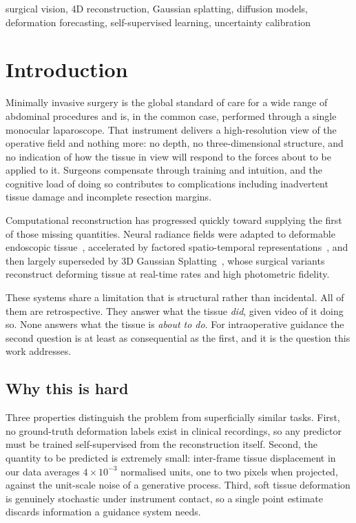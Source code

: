 \documentclass[conference]{IEEEtran}
\begin{document}
\begin{IEEEkeywords}
surgical vision, 4D reconstruction, Gaussian splatting, diffusion models,
deformation forecasting, self-supervised learning, uncertainty calibration
\end{IEEEkeywords}

\section{Introduction}

Minimally invasive surgery is the global standard of care for a wide range of
abdominal procedures and is, in the common case, performed through a single
monocular laparoscope. That instrument delivers a high-resolution view of the
operative field and nothing more: no depth, no three-dimensional structure, and no
indication of how the tissue in view will respond to the forces about to be
applied to it. Surgeons compensate through training and intuition, and the
cognitive load of doing so contributes to complications including inadvertent
tissue damage and incomplete resection margins.

Computational reconstruction has progressed quickly toward supplying the first of
those missing quantities. Neural radiance fields were adapted to deformable
endoscopic tissue~\cite{wang2022endonerf}, accelerated by factored spatio-temporal
representations~\cite{ruan2023lerplane}, and then largely superseded by 3D
Gaussian Splatting~\cite{kerbl2023gaussian}, whose surgical
variants~\cite{liu2024endogaussian,yang2024deform3dgs} reconstruct deforming
tissue at real-time rates and high photometric fidelity.

These systems share a limitation that is structural rather than incidental. All of
them are retrospective. They answer what the tissue \emph{did}, given video of it
doing so. None answers what the tissue is \emph{about to do}. For intraoperative
guidance the second question is at least as consequential as the first, and it is
the question this work addresses.

\subsection{Why this is hard}
Three properties distinguish the problem from superficially similar tasks. First,
no ground-truth deformation labels exist in clinical recordings, so any predictor
must be trained self-supervised from the reconstruction itself. Second, the
quantity to be predicted is extremely small: inter-frame tissue displacement in our
data averages $4\times10^{-3}$ normalised units, one to two pixels when projected,
against the unit-scale noise of a generative process. Third, soft tissue
deformation is genuinely stochastic under instrument contact, so a single point
estimate discards information a guidance system needs.
\end{document}
